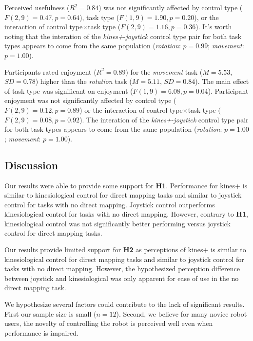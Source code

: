 \documentclass{sigchi}
\begin{document}
Perceived usefulness ($R^{2}=0.84$) was not significantly affected by control type ($F(2, 9)=0.47, p=0.64$), task type ($F(1, 9)=1.90, p=0.20$), or the interaction of control type$\times$task type  ($F(2, 9)=1.16, p=0.36$). It's worth noting that the interation of the \textit{kines+}-\textit{joystick} control type pair for both task types appears to come from the same population (\textit{rotation}: $p=0.99$; \textit{movement}: $p=1.00$).

Participants rated enjoyment ($R^{2}=0.89$) for the \textit{movement} task ($M=5.53$, $SD=0.78$) higher than the \textit{rotation} task ($M=5.11$, $SD=0.84$). The main effect of task type was significant on enjoyment ($F(1, 9)=6.08, p=0.04$). Participant enjoyment was not significantly affected by control type ($F(2, 9)=0.12, p=0.89$) or the interaction of control type$\times$task type  ($F(2, 9)=0.08, p=0.92$). The interation of the \textit{kines+}-\textit{joystick} control type pair for both task types appears to come from the same population (\textit{rotation}: $p=1.00$; \textit{movement}: $p=1.00$).

\subsection{Discussion}

Our results were able to provide some support for \textbf{H1}. Performance for kines+ is similar to kinesiological control for direct mapping tasks and similar to joystick control for tasks with no direct mapping. Joystick control outperforms kinesiological control for tasks with no direct mapping. However, contrary to \textbf{H1}, kinesiological control was not significantly better performing versus joystick control for direct mapping tasks.

Our results provide limited support for \textbf{H2} as perceptions of kines+ is similar to kinesiological control for direct mapping tasks and similar to joystick control for tasks with no direct mapping. However, the hypothesized perception difference between joystick and kinesiological was only apparent for ease of use in the no direct mapping task.

We hypothesize several factors could contribute to the lack of significant results. First our sample size is small ($n=12$). Second, we believe for many novice robot users, the novelty of controlling the robot is perceived well even when performance is impaired.
\end{document}
